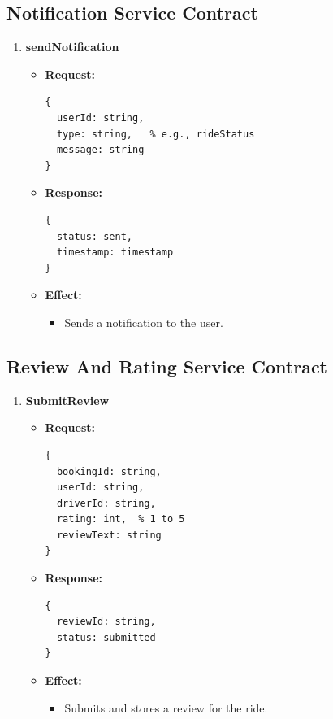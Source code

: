 \documentclass[a4paper,12pt]{article}
\begin{document}
\subsection*{Notification Service Contract}

\begin{enumerate}
  \item \textbf{sendNotification}
    \begin{itemize}
      \item \textbf{Request:}
      \begin{verbatim}
{
  userId: string,
  type: string,   % e.g., rideStatus
  message: string
}
      \end{verbatim}
      \item \textbf{Response:}
      \begin{verbatim}
{
  status: sent,
  timestamp: timestamp
}
      \end{verbatim}
      \item \textbf{Effect:}
      \begin{itemize}
        \item Sends a notification to the user.
      \end{itemize}
    \end{itemize}
\end{enumerate}

\subsection*{Review And Rating Service Contract}

\begin{enumerate}
  \item \textbf{SubmitReview}
    \begin{itemize}
      \item \textbf{Request:}
      \begin{verbatim}
{
  bookingId: string,
  userId: string,
  driverId: string,
  rating: int,  % 1 to 5
  reviewText: string
}
      \end{verbatim}
      \item \textbf{Response:}
      \begin{verbatim}
{
  reviewId: string,
  status: submitted
}
      \end{verbatim}
      \item \textbf{Effect:}
      \begin{itemize}
        \item Submits and stores a review for the ride.
      \end{itemize}
    \end{itemize}
\end{enumerate}
\end{document}
